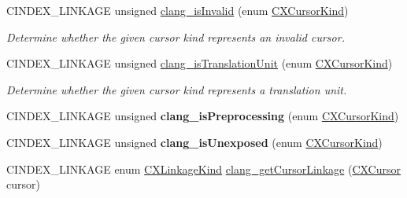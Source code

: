\begin{DoxyCompactItemize}
\mbox{\label{group__CINDEX__CURSOR__MANIP_ga86d525c70189f9d04caf5aa59121c384}} 
C\+I\+N\+D\+E\+X\+\_\+\+L\+I\+N\+K\+A\+GE unsigned \mbox{\hyperlink{group__CINDEX__CURSOR__MANIP_ga86d525c70189f9d04caf5aa59121c384}{clang\+\_\+is\+Invalid}} (enum \mbox{\hyperlink{group__CINDEX_gaaccc432245b4cd9f2d470913f9ef0013}{C\+X\+Cursor\+Kind}})
\begin{DoxyCompactList}\small\item\em Determine whether the given cursor kind represents an invalid cursor. \end{DoxyCompactList}\item 
\mbox{\label{group__CINDEX__CURSOR__MANIP_gaa25633b28eb4799da0952e9beb03799b}} 
C\+I\+N\+D\+E\+X\+\_\+\+L\+I\+N\+K\+A\+GE unsigned \mbox{\hyperlink{group__CINDEX__CURSOR__MANIP_gaa25633b28eb4799da0952e9beb03799b}{clang\+\_\+is\+Translation\+Unit}} (enum \mbox{\hyperlink{group__CINDEX_gaaccc432245b4cd9f2d470913f9ef0013}{C\+X\+Cursor\+Kind}})
\begin{DoxyCompactList}\small\item\em Determine whether the given cursor kind represents a translation unit. \end{DoxyCompactList}\item 
\mbox{\label{group__CINDEX__CURSOR__MANIP_gab2c617ece02f6e3f41e403b8c7d85bce}} 
C\+I\+N\+D\+E\+X\+\_\+\+L\+I\+N\+K\+A\+GE unsigned {\bfseries clang\+\_\+is\+Preprocessing} (enum \mbox{\hyperlink{group__CINDEX_gaaccc432245b4cd9f2d470913f9ef0013}{C\+X\+Cursor\+Kind}})
\item 
\mbox{\label{group__CINDEX__CURSOR__MANIP_ga838c465c6d1e681d2469eaa5adffcceb}} 
C\+I\+N\+D\+E\+X\+\_\+\+L\+I\+N\+K\+A\+GE unsigned {\bfseries clang\+\_\+is\+Unexposed} (enum \mbox{\hyperlink{group__CINDEX_gaaccc432245b4cd9f2d470913f9ef0013}{C\+X\+Cursor\+Kind}})
\item 
\mbox{\label{group__CINDEX__CURSOR__MANIP_ga359dae25aa1a71176a5e33f3c7ee1740}} 
C\+I\+N\+D\+E\+X\+\_\+\+L\+I\+N\+K\+A\+GE enum \mbox{\hyperlink{group__CINDEX__CURSOR__MANIP_gace57c68a7a11b0967b184a7ef9fbeb9e}{C\+X\+Linkage\+Kind}} \mbox{\hyperlink{group__CINDEX__CURSOR__MANIP_ga359dae25aa1a71176a5e33f3c7ee1740}{clang\+\_\+get\+Cursor\+Linkage}} (\mbox{\hyperlink{structCXCursor}{C\+X\+Cursor}} cursor)

\end{DoxyCompactItemize}

